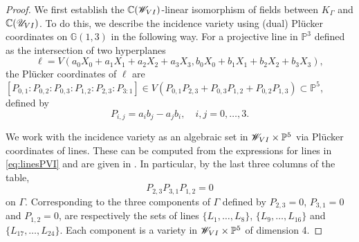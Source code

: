 \documentclass[10pt,a4paper]{amsart}
\newcommand{\C}{\mathbb{C}}
\newcommand{\p}{\mathbb{P}}
\begin{document}
\begin{proof}
    We first establish the $\C(\mathscr{W}_{\rm{VI}})$-linear isomorphism of fields between $K_{\Gamma}$ and $\C(\mathscr{U}_{\rm{VI}})$. 
    To do this, we describe the incidence variety using (dual) Pl\"ucker coordinates on $\mathbb{G}(1,3)$ in the following way.
For a projective line in $\p^3$ defined as the intersection of two hyperplanes
\begin{equation*}
    \ell = V( a_0 X_0+a_1X_1+a_2X_2+a_3X_3, b_0 X_0+b_1X_1+b_2X_2+b_3X_3),
\end{equation*}
the Pl\"ucker coordinates of $\ell$ are $[P_{0,1}:P_{0,2}:P_{0,3}:P_{1,2}:P_{2,3}:P_{3:1}]\in V(P_{0,1}P_{2,3}+ P_{0,3}P_{1,2}+P_{0,2}P_{1,3})\subset \p^5$, defined by 
\begin{equation*}
    P_{i,j}=a_i b_j - a_j b_i, \quad i,j=0,\dots,3.
\end{equation*}

We work with the incidence variety as an algebraic set in $\mathscr{W}_{\rm{VI}}\times \p^5$ via Pl\"ucker coordinates of lines.
These can be computed from the expressions for lines in \eqref{eq:linesPVI} and are given in .
In particular, by the last three columns of the table,
\begin{equation*}
    P_{2,3}P_{3,1}P_{1,2}=0
\end{equation*}
on $\Gamma$. Corresponding to the three components of $\Gamma$ defined by $P_{2,3}=0$, $P_{3,1}=0$ and $P_{1,2}=0$,
are respectively the sets of lines
 $\{L_1,\ldots, L_8\}$, $\{L_9,\ldots, L_{16}\}$ and $\{L_{17},\ldots, L_{24}\}$.
Each component is a variety in $\mathscr{W}_{\rm{VI}}\times \p^5$ of dimension 4.


\end{proof}
\end{document}
